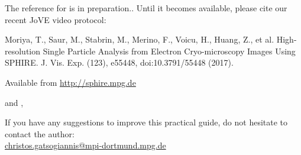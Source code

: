 



\newcommand{\mytopic}{{\fontsize{50}{60}\selectfont{SPHIRE}}}
\newcommand{\myexplanation}{{\Huge{Structure determination with}}}
\newcommand{\mytitle}{{\fontsize{50}{60}\selectfont{A practical guide}}}
\newcommand{\mydate}{{\huge{March 2018}\\\Large{Version 1.0}}}




\frontmatter

\AddToShipoutPicture*{\TitelPage}

\thispagestyle{empty}
\null
\clearpage
\thispagestyle{first}






The reference for \sphire{} is in preparation..
Until it becomes available, please cite our recent \sphire{} JoVE video protocol:

Moriya, T., Saur, M., Stabrin, M., Merino, F., Voicu, H., Huang, Z., et al.
High-resolution Single Particle Analysis from Electron Cryo-microscopy Images Using SPHIRE.
J. Vis. Exp. (123), e55448, doi:10.3791/55448 (2017).

Available from \url{http://sphire.mpg.de}

and \parencite{Penczek:2014ji}, \parencite{Yang:2012dv}
\vspace{\fill}

If you have any suggestions to improve this practical guide, do not hesitate to contact the author:\\
\href{mailto:christos.gatsogiannis@mpi-dortmund.mpg.de}{christos.gatsogiannis@mpi-dortmund.mpg.de}

\printbibliography


